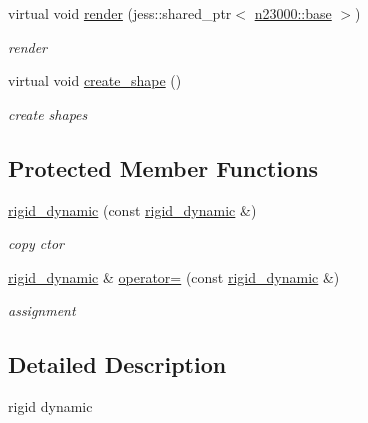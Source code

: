 \begin{DoxyCompactItemize}
virtual void \hyperlink{classnebula_1_1content_1_1actor_1_1physics_1_1rigid__dynamic_a24bc7fc5707d3d387e57d0516f1cbd0e}{render} (jess::shared\_\-ptr$<$ \hyperlink{classnebula_1_1platform_1_1renderer_1_1base}{n23000::base} $>$)
\begin{DoxyCompactList}\small\item\em render \item\end{DoxyCompactList}\item 
virtual void \hyperlink{classnebula_1_1content_1_1actor_1_1physics_1_1rigid__dynamic_ad59b3dbeace9a34450aa6d81af4a3049}{create\_\-shape} ()
\begin{DoxyCompactList}\small\item\em create shapes \item\end{DoxyCompactList}\end{DoxyCompactItemize}
\subsection*{Protected Member Functions}
\begin{DoxyCompactItemize}
\item 
\hyperlink{classnebula_1_1content_1_1actor_1_1physics_1_1rigid__dynamic_a882b52f5aa77a31146bcb07b36abc44f}{rigid\_\-dynamic} (const \hyperlink{classnebula_1_1content_1_1actor_1_1physics_1_1rigid__dynamic}{rigid\_\-dynamic} \&)
\begin{DoxyCompactList}\small\item\em copy ctor \item\end{DoxyCompactList}\item 
\hyperlink{classnebula_1_1content_1_1actor_1_1physics_1_1rigid__dynamic}{rigid\_\-dynamic} \& \hyperlink{classnebula_1_1content_1_1actor_1_1physics_1_1rigid__dynamic_a115e82dbc90ce5ae9f8d41724f1bd44d}{operator=} (const \hyperlink{classnebula_1_1content_1_1actor_1_1physics_1_1rigid__dynamic}{rigid\_\-dynamic} \&)
\begin{DoxyCompactList}\small\item\em assignment \item\end{DoxyCompactList}\end{DoxyCompactItemize}


\subsection{Detailed Description}
rigid dynamic 

